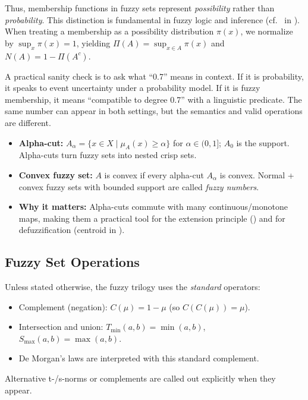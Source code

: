 Thus, membership functions in fuzzy sets represent \emph{possibility} rather than \emph{probability}. This distinction is fundamental in fuzzy logic and inference (cf.~ in ). When treating a membership as a possibility distribution \(\pi(x)\), we normalize by \(\sup_x \pi(x)=1\), yielding \(\Pi(A)=\sup_{x\in A}\pi(x)\) and \(N(A)=1-\Pi(A^c)\).

A practical sanity check is to ask what ``0.7'' means in context. If it is probability, it speaks to event uncertainty under a probability model. If it is fuzzy membership, it means ``compatible to degree 0.7'' with a linguistic predicate. The same number can appear in both settings, but the semantics and valid operations are different.

\begin{tcolorbox}[summarybox, title={Alpha-cuts, convexity, and fuzzy numbers}]
\begin{itemize}
    \item \textbf{Alpha-cut:} \(A_\alpha = \{x\in X \mid \mu_A(x)\ge \alpha\}\) for \(\alpha\in(0,1]\); \(A_0\) is the support. Alpha-cuts turn fuzzy sets into nested crisp sets.
    \item \textbf{Convex fuzzy set:} \(A\) is convex if every alpha-cut \(A_\alpha\) is convex. Normal + convex fuzzy sets with bounded support are called \emph{fuzzy numbers}.
    \item \textbf{Why it matters:} Alpha-cuts commute with many continuous/monotone maps, making them a practical tool for the extension principle () and for defuzzification (centroid in ).
\end{itemize}
\end{tcolorbox}

\subsection{Fuzzy Set Operations}
\label{sec:fuzzysets_fuzzy_set_operations}

\begin{tcolorbox}[summarybox, title={Operator defaults used in \Crefrange{chap:fuzzysets}{chap:fuzzyinference}}]
Unless stated otherwise, the fuzzy trilogy uses the \emph{standard} operators:
\begin{itemize}
    \item Complement (negation): \(C(\mu) = 1 - \mu\) (so \(C(C(\mu))=\mu\)).
    \item Intersection and union: \(T_{\min}(a, b)=\min(a, b)\), \(S_{\max}(a, b)=\max(a, b)\).
    \item De Morgan's laws are interpreted with this standard complement.
\end{itemize}
Alternative t-/s\hyp{}norms or complements are called out explicitly when they appear.
\end{tcolorbox}

